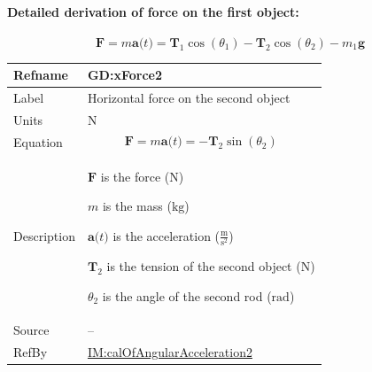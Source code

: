 \documentclass[12pt]{article}
\begin{document}
\paragraph{Detailed derivation of force on the first object:}
\label{GD:yForce1Deriv}
\begin{displaymath}
\symbf{F}=m \symbf{a}\text{(}t\text{)}={\symbf{T}_{1}} \cos\left({θ_{1}}\right)-{\symbf{T}_{2}} \cos\left({θ_{2}}\right)-{m_{1}} \symbf{g}
\end{displaymath}
\vspace{\baselineskip}
\noindent
\begin{minipage}{\textwidth}
\begin{tabular}{>{\raggedright}p{}>{\raggedright\arraybackslash}p{}}
\toprule \textbf{Refname} & \textbf{GD:xForce2}
\label{GD:xForce2}
\\ \midrule
Label & Horizontal force on the second object
        
\\ \midrule
Units & ${\text{N}}$
        
\\ \midrule
Equation & \begin{displaymath}
           \symbf{F}=m \symbf{a}\text{(}t\text{)}=-{\symbf{T}_{2}} \sin\left({θ_{2}}\right)
           \end{displaymath}
\\ \midrule
Description & \begin{symbDescription}
              \item{$\symbf{F}$ is the force (${\text{N}}$)}
              \item{$m$ is the mass (${\text{kg}}$)}
              \item{$\symbf{a}\text{(}t\text{)}$ is the acceleration ($\frac{\text{m}}{\text{s}^{2}}$)}
              \item{${\symbf{T}_{2}}$ is the tension of the second object (${\text{N}}$)}
              \item{${θ_{2}}$ is the angle of the second rod (${\text{rad}}$)}
              \end{symbDescription}
\\ \midrule
Source & --
         
\\ \midrule
RefBy & \hyperref[IM:calOfAngularAcceleration2]{IM:calOfAngularAcceleration2}
        
\\ \bottomrule
\end{tabular}
\end{minipage}
\end{document}
